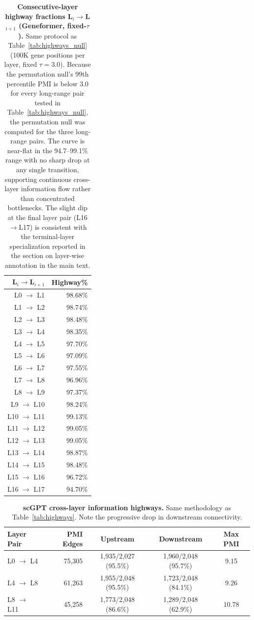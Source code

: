 \documentclass[11pt]{article}
\begin{document}
\begin{table}[H]
\centering
\caption{\textbf{Consecutive-layer highway fractions L$_i$$\to$L$_{i+1}$ (Geneformer, fixed-$\tau$).} Same protocol as Table~\ref{tab:highways_null} (100K gene positions per layer, fixed $\tau{=}3.0$). Because the permutation null's 99th percentile PMI is below 3.0 for every long-range pair tested in Table~\ref{tab:highways_null}, the permutation null was computed for the three long-range pairs. The curve is near-flat in the 94.7--99.1\% range with no sharp drop at any single transition, supporting continuous cross-layer information flow rather than concentrated bottlenecks. The slight dip at the final layer pair (L16$\to$L17) is consistent with the terminal-layer specialization reported in the section on layer-wise annotation in the main text.}
\label{tab:highways_consecutive}
\smallskip
\small
\begin{tabular}{rr}
\toprule
L$_i$$\to$L$_{i+1}$ & Highway\% \\
\midrule
L0  $\to$ L1  & 98.68\% \\
L1  $\to$ L2  & 98.74\% \\
L2  $\to$ L3  & 98.48\% \\
L3  $\to$ L4  & 98.35\% \\
L4  $\to$ L5  & 97.70\% \\
L5  $\to$ L6  & 97.09\% \\
L6  $\to$ L7  & 97.55\% \\
L7  $\to$ L8  & 96.96\% \\
L8  $\to$ L9  & 97.37\% \\
L9  $\to$ L10 & 98.24\% \\
L10 $\to$ L11 & 99.13\% \\
L11 $\to$ L12 & 99.05\% \\
L12 $\to$ L13 & 99.05\% \\
L13 $\to$ L14 & 98.87\% \\
L14 $\to$ L15 & 98.48\% \\
L15 $\to$ L16 & 96.72\% \\
L16 $\to$ L17 & 94.70\% \\
\bottomrule
\end{tabular}
\end{table}

\begin{table}[H]
\centering
\caption{\textbf{scGPT cross-layer information highways.} Same methodology as Table~\ref{tab:highways}. Note the progressive drop in downstream connectivity.}
\label{tab:scgpt_highways}
\smallskip
\begin{tabular}{lrccc}
\toprule
Layer Pair & PMI Edges & Upstream & Downstream & Max PMI \\
\midrule
L0 $\to$ L4  & 75,305 & 1,935/2,027 (95.5\%) & 1,960/2,048 (95.7\%) & 9.15 \\
L4 $\to$ L8  & 61,263 & 1,955/2,048 (95.5\%) & 1,723/2,048 (84.1\%) & 9.26 \\
L8 $\to$ L11 & 45,258 & 1,773/2,048 (86.6\%) & 1,289/2,048 (62.9\%) & 10.78 \\
\bottomrule
\end{tabular}
\end{table}
\end{document}

